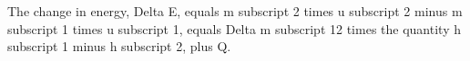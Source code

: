 The change in energy, Delta E, equals m subscript 2 times u subscript 2 minus m subscript 1 times u subscript 1, equals Delta m subscript 12 times the quantity h subscript 1 minus h subscript 2, plus Q.